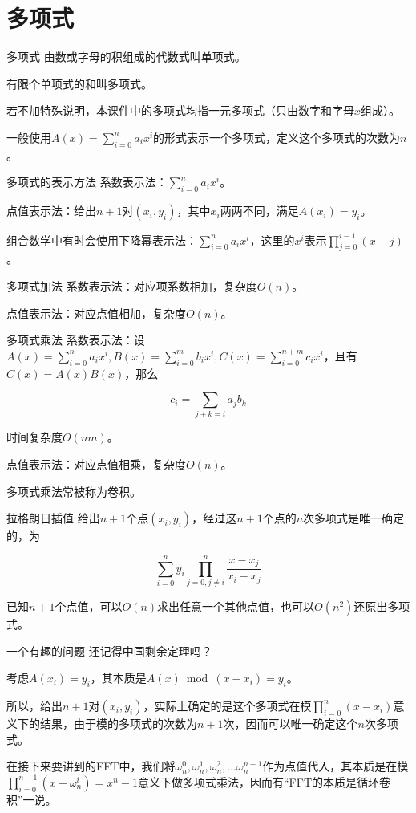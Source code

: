 \documentclass{beamer}
\begin{document}
	\section{多项式}
	\begin{frame}{多项式}
		由数或字母的积组成的代数式叫单项式。
		
		有限个单项式的和叫多项式。
		
		若不加特殊说明，本课件中的多项式均指一元多项式（只由数字和字母$x$组成）。
		
		一般使用$A(x)=\sum_{i=0}^na_ix^i$的形式表示一个多项式，定义这个多项式的次数为$n$。
	\end{frame}
	\begin{frame}{多项式的表示方法}
		系数表示法：$\sum_{i=0}^na_ix^i$。
		
		点值表示法：给出$n+1$对$(x_i,y_i)$，其中$x_i$两两不同，满足$A(x_i)=y_i$。
		
		组合数学中有时会使用下降幂表示法：$\sum_{i=0}^na_ix^{\underline{i}}$，这里的$x^{\underline{i}}$表示$\prod_{j=0}^{i-1}(x-j)$。
	\end{frame}
	\begin{frame}{多项式加法}
		系数表示法：对应项系数相加，复杂度$O(n)$。
		
		点值表示法：对应点值相加，复杂度$O(n)$。
	\end{frame}
	\begin{frame}{多项式乘法}
		系数表示法：设$A(x)=\sum_{i=0}^na_ix^i,B(x)=\sum_{i=0}^mb_ix^i,C(x)=\sum_{i=0}^{n+m}c_ix^i$，且有$C(x)=A(x)B(x)$，那么
		
		$$c_i=\sum_{j+k=i}a_jb_k$$
		
		时间复杂度$O(nm)$。
		
		点值表示法：对应点值相乘，复杂度$O(n)$。
		
		多项式乘法常被称为卷积。
	\end{frame}
	\begin{frame}{拉格朗日插值}
		给出$n+1$个点$(x_i,y_i)$，经过这$n+1$个点的$n$次多项式是唯一确定的，为
		
		$$\sum_{i=0}^ny_i\prod_{j=0,j\neq i}^n\frac{x-x_j}{x_i-x_j}$$
		
		已知$n+1$个点值，可以$O(n)$求出任意一个其他点值，也可以$O(n^2)$还原出多项式。
	\end{frame}
	\begin{frame}{一个有趣的问题}
		还记得中国剩余定理吗？
		
		考虑$A(x_i)=y_i$，其本质是$A(x) \bmod (x-x_i) = y_i$。
		
		所以，给出$n+1$对$(x_i,y_i)$，实际上确定的是这个多项式在模$\prod_{i=0}^n(x-x_i)$意义下的结果，由于模的多项式的次数为$n+1$次，因而可以唯一确定这个$n$次多项式。
		
		在接下来要讲到的FFT中，我们将$\omega_n^0,\omega_n^1,\omega_n^2,...\omega_n^{n-1}$作为点值代入，其本质是在模$\prod_{i=0}^{n-1}(x-\omega_n^i)=x^n-1$意义下做多项式乘法，因而有“FFT的本质是循环卷积”一说。
	\end{frame}
\end{document}
